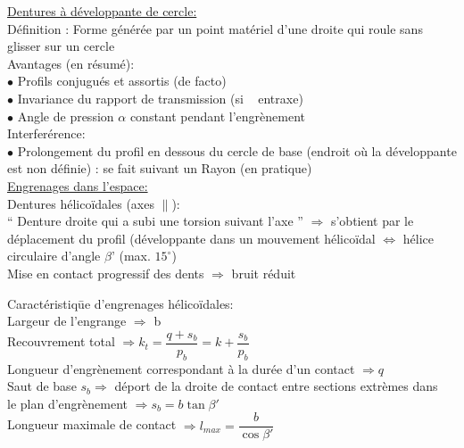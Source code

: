 \underline{Dentures à développante de cercle:}\\
{\color{orange}Définition} : Forme générée par un point matériel d’une droite qui roule sans glisser sur un cercle\\

{\color{orange}Avantages} (en résumé):\\
$\bullet$ Profils conjugués et assortis (de facto)\\
$\bullet$ Invariance du rapport de transmission (si ~ entraxe)\\
$\bullet$ Angle de pression $\alpha$ constant pendant l’engrènement\\

{\color{orange}Interferérence}:\\
$\bullet$ Prolongement du profil en dessous du cercle de base (endroit où la développante est non définie) : se fait suivant un Rayon (en pratique)\\

\underline{Engrenages dans l’espace:}\\
Dentures {\color{orange}hélicoïdales} (axes $\parallel$):\\
“ Denture droite qui a subi une torsion suivant l’axe ” $\Rightarrow$ s’obtient par le déplacement du profil (développante dans un mouvement hélicoïdal $\Leftrightarrow$ hélice circulaire d’angle $\beta’$ (max. $15^\circ$)\\
Mise en contact {\color{orange}progressif} des dents $\Rightarrow$ bruit réduit\\

\begin{orangebox}
\begin{tabbing}
Caractéristiq\=ue d'engrenages hélicoïdales:\\
\> Largeur de l'engrange $\Rightarrow$ b\\
\>Recouvrement total $\Rightarrow k_t = \dfrac{q+s_b}{p_b}=k+\dfrac{s_b}{p_b}$\\
\> Longueur d’engrènement correspondant à la durée d’un contact $\Rightarrow q$\\
\> Saut de base $s_b \Rightarrow$ déport de la droite de contact entre sections extrèmes dans\\
\>le plan d’engrènement $\Rightarrow s_b = b\tan\beta'$\\
\> Longueur maximale de contact $\Rightarrow l_{max} = \dfrac{b}{\cos\beta'}$
\end{tabbing}
\end{orangebox}\\\\

